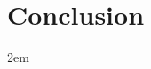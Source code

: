 \documentclass[
  paper=a4, %
  11pt, %
  bibliography=totoc, %
  parskip=off, %
  oneside, %
  article, %
  accentcolor=tud2b,
  colorback, %
  type=bsc, %
]{tudthesis}
\begin{document}

\label{sec:experiments}

\section{Conclusion}
\parindent 2em
\onehalfspacing


\label{sec:conclusion}

%
\singlespacing
\printbibliography[title=Bibliography, heading=bibliography]


\clearpage
\appendix


\clearpage
\end{document}
